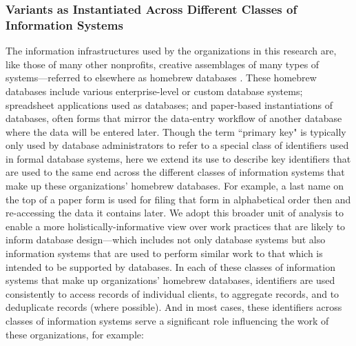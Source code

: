 \subsubsection{Variants as Instantiated Across Different Classes of Information Systems}
The information infrastructures used by the organizations in this research are, like those of many other nonprofits, creative assemblages of many types of systems---referred to elsewhere as homebrew databases \citep{Voida2011Homebrew}. These homebrew databases include various enterprise-level or custom database systems; spreadsheet applications used as databases; and paper-based instantiations of databases, often forms that mirror the data-entry workflow of another database where the data will be entered later. Though the term ``primary key" is typically only used by database administrators to refer to a special class of identifiers used in formal database systems, here we extend its use to describe key identifiers that are used to the same end across the different classes of information systems that make up these organizations' homebrew databases. For example, a last name on the top of a paper form is used for filing that form in alphabetical order then and re-accessing the data it contains later. We adopt this broader unit of analysis to enable a more holistically-informative view over work practices that are likely to inform database design---which includes not only database systems but also information systems that are used to perform similar work to that which is intended to be supported by databases. In each of these classes of information systems that make up organizations' homebrew databases, identifiers are used consistently to access records of individual clients, to aggregate records, and to deduplicate records (where possible). And in most cases, these identifiers across classes of information systems serve a significant role influencing the work of these organizations, for example:


